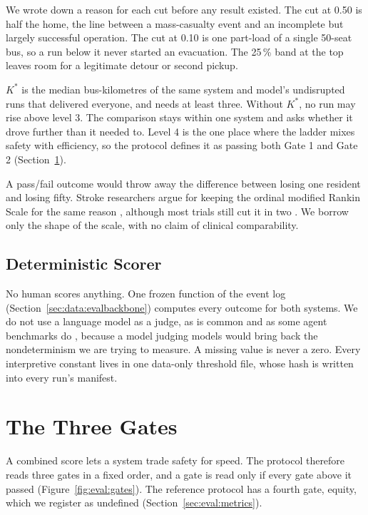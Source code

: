 We wrote down a reason for each cut before any result existed. The cut at 0.50
is half the home, the line between a mass-casualty event and an incomplete but
largely successful operation. The cut at 0.10 is one part-load of a single
50-seat bus, so a run below it never started an evacuation. The
25\,\% band at the top leaves room for a legitimate detour or second pickup.

$K^\ast$ is the median bus-kilometres of the same system and model's
undisrupted  runs that delivered everyone, and needs at
least three. Without $K^\ast$, no
run may rise above level 3. The comparison stays within one system and asks
whether it drove further than it needed to. Level 4 is the one place where the
ladder mixes safety with efficiency, so the protocol defines it as passing both
Gate 1 and Gate 2 (Section~\ref{sec:eval:gates}).

A pass/fail outcome would throw away the difference between losing one
resident and losing fifty. Stroke researchers argue for keeping the ordinal modified
Rankin Scale for the same reason \parencite{ganesh2018}, although most trials
still cut it in two \parencite{nunn2016}. We borrow only the shape of the scale, with no claim of
clinical comparability.

\subsection{Deterministic Scorer}
\label{sec:eval:scorer}

No human scores anything. One frozen function of the event log
(Section~\ref{sec:data:evalbackbone}) computes every outcome for both systems.
We do not use a language model as a judge, as is common \parencite{zheng2023}
and as some agent benchmarks do \parencite{xu2025}, because a model judging
models would bring back the nondeterminism we are trying to measure. A missing
value is never a zero. Every interpretive constant lives in one data-only
threshold file, whose hash is written into every run's manifest.

\section{The Three Gates}
\label{sec:eval:gates}

A combined score lets a system trade safety for speed. The protocol therefore
reads three gates in a fixed order, and a gate is read only if every gate above
it passed (Figure~\ref{fig:eval:gates}). The reference protocol has a fourth
gate, equity, which we register as undefined
(Section~\ref{sec:eval:metrics}).

